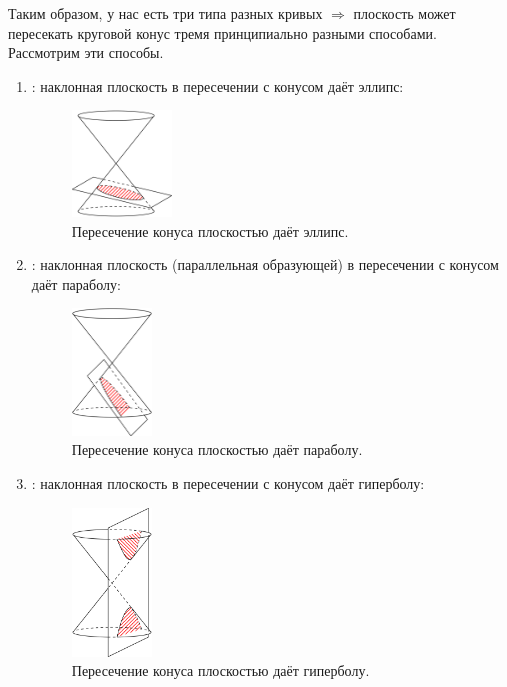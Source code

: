 \documentclass[12pt]{article}
\theoremstyle{definition}
\begin{document}
Таким образом, у нас есть три типа разных кривых $\Rightarrow$ плоскость может пересекать круговой конус тремя принципиально разными способами. Рассмотрим эти способы.

\begin{enumerate}[label=\arabic*)]
	\item {}: наклонная плоскость в пересечении с конусом даёт эллипс:
	\begin{figure}[H]
		\centering
		\includegraphics[width=0.25\textwidth]{ANGL1_5.png}
		\caption{Пересечение конуса плоскостью даёт эллипс.}
		\label{1_5}
	\end{figure}
	\item {}: наклонная плоскость (параллельная образующей) в пересечении с конусом даёт параболу:
	\begin{figure}[H]
		\centering
		\includegraphics[width=0.2\textwidth]{ANGL1_6.png}
		\caption{Пересечение конуса плоскостью даёт параболу.}
		\label{1_6}
	\end{figure}
	\item {}: наклонная плоскость в пересечении с конусом даёт гиперболу:
	\begin{figure}[H]
		\centering
		\includegraphics[width=0.2\textwidth]{ANGL1_7.png}
		\caption{Пересечение конуса плоскостью даёт гиперболу.}
		\label{1_7}
	\end{figure}
\end{enumerate}
\end{document}
